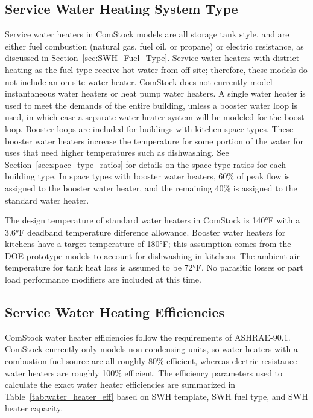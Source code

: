 \subsection{Service Water Heating System Type}

Service water heaters in ComStock models are all storage tank style, and are either fuel combustion (natural gas, fuel oil, or propane) or electric resistance, as discussed in  Section~\ref{sec:SWH_Fuel_Type}. Service water heaters with district heating as the fuel type receive hot water from off-site; therefore, these models do not include an on-site water heater. ComStock does not currently model instantaneous water heaters or heat pump water heaters. A single water heater is used to meet the demands of the entire building, unless a booster water loop is used, in which case a separate water heater system will be modeled for the boost loop. Booster loops are included for buildings with kitchen space types. These booster water heaters increase the temperature for some portion of the water for uses that need higher temperatures such as dishwashing. See Section~\ref{sec:space_type_ratios} for details on the space type ratios for each building type. In space types with booster water heaters, 60\% of peak flow is assigned to the booster water heater, and the remaining 40\% is assigned to the standard water heater.

The design temperature of standard water heaters in ComStock is 140°F with a 3.6°F deadband temperature difference allowance. Booster water heaters for kitchens have a target temperature of 180°F; this assumption comes from the DOE prototype models to account for dishwashing in kitchens. The ambient air temperature for tank heat loss is assumed to be 72°F. No parasitic losses or part load performance modifiers are included at this time.


\subsection{Service Water Heating Efficiencies}

ComStock water heater efficiencies follow the requirements of ASHRAE-90.1. ComStock currently only models non-condensing units, so water heaters with a combustion fuel source are all roughly 80\% efficient, whereas electric resistance water heaters are roughly 100\% efficient. The efficiency parameters used to calculate the exact water heater efficiencies are summarized in Table~\ref{tab:water_heater_eff} based on SWH template, SWH fuel type, and SWH heater capacity. 

